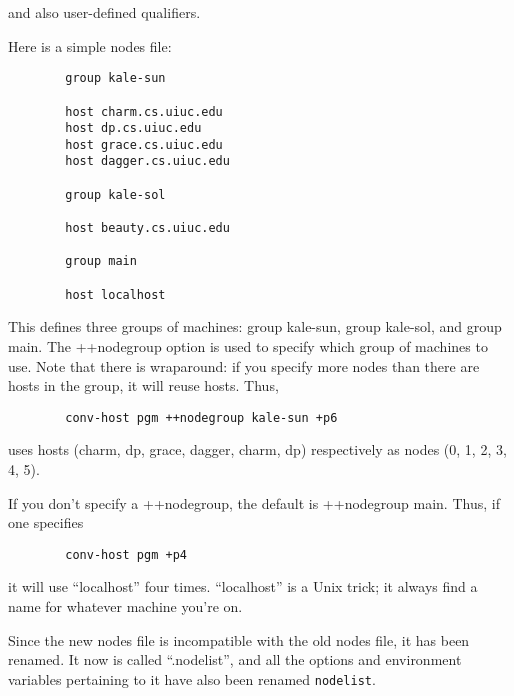\begin{itemize}
and also user-defined qualifiers.

Here is a simple nodes file:

\begin{verbatim}
        group kale-sun
         
        host charm.cs.uiuc.edu
        host dp.cs.uiuc.edu
        host grace.cs.uiuc.edu
        host dagger.cs.uiuc.edu
         
        group kale-sol
         
        host beauty.cs.uiuc.edu
         
        group main
         
        host localhost
\end{verbatim}

This defines three groups of machines: group kale-sun, group kale-sol,
and group main.  The ++nodegroup option is used to specify which group
of machines to use.  Note that there is wraparound: if you specify
more nodes than there are hosts in the group, it will reuse
hosts. Thus,

\begin{verbatim}
        conv-host pgm ++nodegroup kale-sun +p6
\end{verbatim}

uses hosts (charm, dp, grace, dagger, charm, dp) respectively as
nodes (0, 1, 2, 3, 4, 5).

If you don't specify a ++nodegroup, the default is ++nodegroup main.
Thus, if one specifies

\begin{verbatim}
        conv-host pgm +p4
\end{verbatim}

it will use ``localhost'' four times.  ``localhost'' is a Unix
trick; it always find a name for whatever machine you're on.

Since the new nodes file is incompatible with the old nodes file, it has
been renamed.  It now is called ``.nodelist'', and all the options and
environment variables pertaining to it have also been renamed {\tt nodelist}.


\end{itemize}
